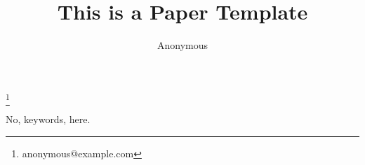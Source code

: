 \documentclass{entcs} \usepackage{entcsmacro}
\begin{document}
\begin{frontmatter}
	\title{This is a Paper Template}
	\author{Anonymous}
	\address{Anonymous Institution}
	\thanks[ALL]{anonymous@example.com}

	\begin{abstract}
		
	\end{abstract}
	\begin{keyword}
		No, keywords, here.
	\end{keyword}
\end{frontmatter}

\pagestyle{empty}






\appendix

\end{document}
